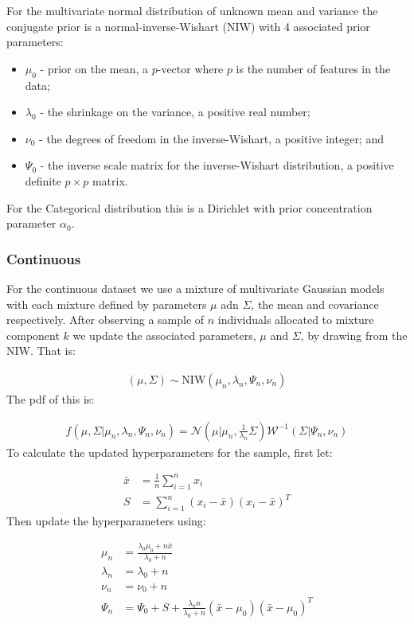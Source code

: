 \documentclass[11pt]{article} %
\begin{document}
 For the multivariate normal distribution of unknown mean and variance the conjugate prior is a normal-inverse-Wishart (NIW) with 4 associated prior parameters:
\begin{itemize}
 \item $\mu_0$ - prior on the mean, a $p$-vector where $p$ is the number of features in the data;
 \item $\lambda_0$ - the shrinkage on the variance, a positive real number;
 \item $\nu_0$ - the degrees of freedom in the inverse-Wishart, a positive integer; and 
 \item $\Psi_0$ - the inverse scale matrix for the inverse-Wishart distribution, a positive definite $p \times p$ matrix.
\end{itemize}
For the Categorical distribution this is a Dirichlet with prior concentration parameter $\alpha_0$.

\subsubsection{Continuous}
For the continuous dataset we use a mixture of multivariate Gaussian models with each mixture defined by parameters $\mu$ adn $\Sigma$, the mean and covariance respectively. After observing a sample of $n$ individuals allocated to mixture component $k$ we update the associated parameters, $\mu$ and $\Sigma$, by drawing from the NIW. That is:

\begin{align}
(\mu, \Sigma) \sim \text{NIW}(\mu_n, \lambda_n, \Psi_n, \nu_n)
\end{align}
The pdf of this is:

\begin{align}
f(\mu, \Sigma | \mu_n, \lambda_n, \Psi_n, \nu_n) = \mathcal{N}\left(\mu | \mu_n, \frac{1}{\lambda_n}\Sigma\right)\mathcal{W}^{-1}\left(\Sigma | \Psi_n, \nu_n \right)
\end{align}
To calculate the updated hyperparameters for the sample, first let:

\begin{align}
\bar{x} &= \frac{1}{n}\sum_{i=1}^n x_i \\
S &= \sum_{i=1}^n (x_i - \bar{x})(x_i - \bar{x})^T
\end{align}
Then update the hyperparameters using:

\begin{align}
\mu_n &= \frac{\lambda_0 \mu_0 + n \bar{x}}{\lambda_0 + n} \\
\lambda_n &= \lambda_0 + n \\
\nu_n &= \nu_0 + n \\
\Psi_n &= \Psi_0 + S + \frac{\lambda_0 n}{\lambda_0 + n}(\bar{x} - \mu_0) (\bar{x} - \mu_0)^T
\end{align}
\end{document}
